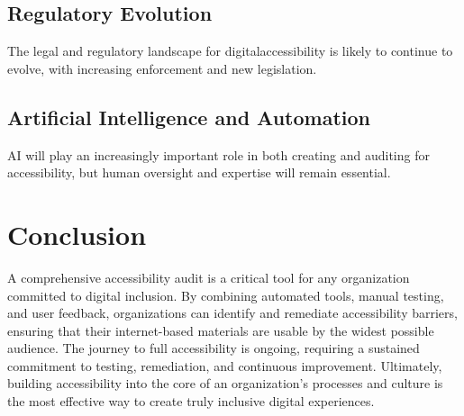 \subsection{Regulatory Evolution}
\label{subsec:regulatory-evolution}
The legal and regulatory landscape for \gls{digitalaccessibility} is likely to continue to evolve, with increasing enforcement and new legislation.
\supercite{WCAG3Draft}

\subsection{Artificial Intelligence and Automation}
\label{subsec:ai-automation}
AI will play an increasingly important role in both creating and auditing for accessibility, but human oversight and expertise will remain essential.
\supercite{MicrosoftAIAccessibility, GoogleMLAccessibility}

\section{Conclusion}
\label{sec:conclusion-auditing}
A comprehensive accessibility audit is a critical tool for any organization committed to digital inclusion. By combining automated tools, manual testing, and user feedback, organizations can identify and remediate accessibility barriers, ensuring that their internet-based materials are usable by the widest possible audience. The journey to full accessibility is ongoing, requiring a sustained commitment to testing, remediation, and continuous improvement. Ultimately, building accessibility into the core of an organization's processes and culture is the most effective way to create truly inclusive digital experiences.
\supercite{Thatcher2006}

